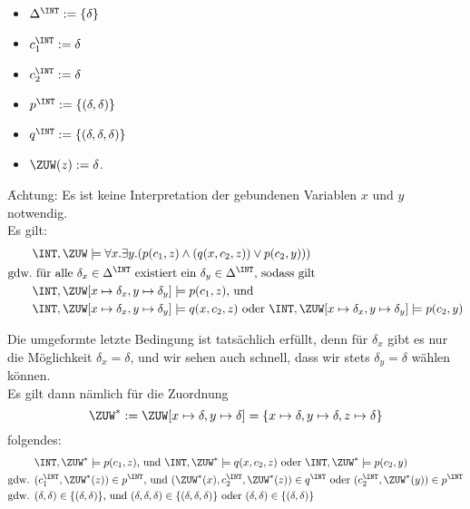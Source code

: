 \begin{enumerate}
\begin{itemize}
	\item $\Delta^{\INT} := \{\delta \}$
	\item $c_1^{\INT} := \delta$
	\item $c_2^{\INT} := \delta$
	\item $p^{\INT} := \{(\delta,\delta)\}$
	\item $q^{\INT} := \{(\delta,\delta,\delta)\}$
	\item $\ZUW(z) := \delta$.
\end{itemize}
\f{Achtung:} Es ist keine Interpretation der gebundenen Variablen $x$ und $y$ notwendig. \\

Es gilt:
\begin{align*}
&\INT, \ZUW \models \forall x.\exists y.(p(c_1,z) \land (q(x,c_2,z)) \lor p(c_2,y))) \\
\text{gdw.} & \text{ für alle } \delta_x \in \Delta^{\INT} \text{ existiert ein } \delta_y \in \Delta^{\INT} \text{, sodass gilt} \\
&\INT,\ZUW [x \mapsto \delta_x, y \mapsto \delta_y ] \models p(c_1, z) \text{, und} \\
&\INT,\ZUW [x \mapsto \delta_x, y \mapsto \delta_y ] \models q(x,c_2,z) \text{ oder } \INT,\ZUW [x \mapsto \delta_x, y \mapsto \delta_y ] \models p(c_2,y)
\end{align*}

Die umgeformte letzte Bedingung ist tatsächlich erfüllt, denn für $\delta_x$ gibt es nur die Möglichkeit $\delta_x=\delta$, und wir sehen auch schnell, dass wir stets $\delta_y=\delta$ wählen können. \\
Es gilt dann nämlich für die Zuordnung
\begin{equation*}
\ZUW^* := \ZUW[x \mapsto \delta, y \mapsto \delta] = \{x \mapsto \delta, y \mapsto \delta, z \mapsto \delta \}
\end{equation*}
folgendes:
\begin{align*}
& \INT, \ZUW^* \models p(c_1, z) \text{, und } \INT, \ZUW^* \models q(x,c_2,z) \text{ oder } \INT,\ZUW^* \models p(c_2,y) \\
\text{gdw. } & (c_1^{\INT}, \ZUW^*(z)) \in p^{\INT} \text{, und } (\ZUW^*(x), c_2^{\INT}, \ZUW^*(z)) \in q^{\INT} \text{ oder } (c_2^{\INT}, \ZUW^*(y)) \in p^{\INT} \\
\text{gdw. } & (\delta, \delta) \in \{(\delta, \delta)\} \text{, und } (\delta, \delta, \delta) \in \{(\delta, \delta, \delta)\} \text{ oder } (\delta,\delta) \in \{(\delta, \delta) \}
\end{align*}
\end{enumerate}


